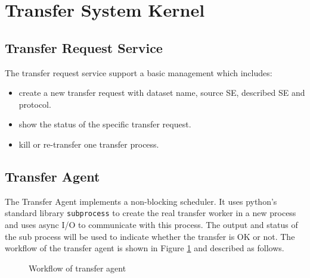 \section{Transfer System Kernel}

\subsection{Transfer Request Service}

The transfer request service support a basic management which includes:
\begin{itemize}
    \item create a new transfer request with dataset name,
          source SE, described SE and protocol.
    \item show the status of the specific transfer request.
    \item kill or re-transfer one transfer process.
\end{itemize}
%
\subsection{Transfer Agent}
%
The Transfer Agent implements a non-blocking scheduler.
It uses python's standard library {\tt subprocess} to 
create the real transfer worker in a new process
and uses async I/O to communicate with this process.
The output and status of the sub process will be used 
to indicate whether the transfer is OK or not.
%
The workflow of the transfer agent is shown in Figure \ref{fig:agent}
and described as follows.
\begin{figure}[htbp]
    
    \caption{Workflow of transfer agent} \label{fig:agent}
\end{figure}


